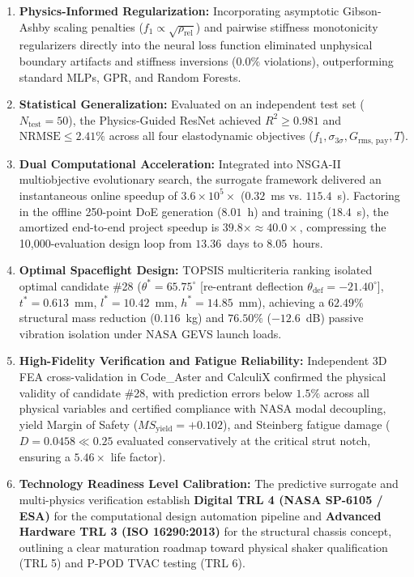 \documentclass[preprint,12pt,3p]{elsarticle}
\newcommand{\Grmspay}{G_{\text{rms, pay}}}
\begin{document}
\begin{enumerate}
  \item \textbf{Physics-Informed Regularization:} Incorporating asymptotic Gibson-Ashby scaling penalties ($f_1 \propto \sqrt{\rho_{\text{rel}}}$) and pairwise stiffness monotonicity regularizers directly into the neural loss function eliminated unphysical boundary artifacts and stiffness inversions ($0.0\%$ violations), outperforming standard MLPs, GPR, and Random Forests.
  \item \textbf{Statistical Generalization:} Evaluated on an independent test set ($N_{\text{test}} = 50$), the Physics-Guided ResNet achieved $R^2 \ge 0.981$ and $\text{NRMSE} \le 2.41\%$ across all four elastodynamic objectives ($f_1, \sigma_{3\sigma}, \Grmspay, T$).
  \item \textbf{Dual Computational Acceleration:} Integrated into NSGA-II multiobjective evolutionary search, the surrogate framework delivered an instantaneous online speedup of $3.6 \times 10^5\times$ ($0.32$~ms vs. $115.4$~s). Factoring in the offline 250-point DoE generation ($8.01$~h) and training ($18.4$~s), the amortized end-to-end project speedup is $39.8\times \approx 40.0\times$, compressing the 10,000-evaluation design loop from $13.36$~days to $8.05$~hours.
  \item \textbf{Optimal Spaceflight Design:} TOPSIS multicriteria ranking isolated optimal candidate \#28 ($\theta^* = 65.75^\circ$ [re-entrant deflection $\theta_{\text{def}} = -21.40^\circ$], $t^* = 0.613$~mm, $l^* = 10.42$~mm, $h^* = 14.85$~mm), achieving a $62.49\%$ structural mass reduction ($0.116$~kg) and $76.50\%$ ($-12.6$~dB) passive vibration isolation under NASA GEVS launch loads.
  \item \textbf{High-Fidelity Verification and Fatigue Reliability:} Independent 3D FEA cross-validation in Code\_Aster and CalculiX confirmed the physical validity of candidate \#28, with prediction errors below $1.5\%$ across all physical variables and certified compliance with NASA modal decoupling, yield Margin of Safety ($MS_{\text{yield}} = +0.102$), and Steinberg fatigue damage ($D = 0.0458 \ll 0.25$ evaluated conservatively at the critical strut notch, ensuring a $5.46\times$ life factor).
  \item \textbf{Technology Readiness Level Calibration:} The predictive surrogate and multi-physics verification establish \textbf{Digital TRL 4 (NASA SP-6105 / ESA)} for the computational design automation pipeline and \textbf{Advanced Hardware TRL 3 (ISO 16290:2013)} for the structural chassis concept, outlining a clear maturation roadmap toward physical shaker qualification (TRL 5) and P-POD TVAC testing (TRL 6).
\end{enumerate}
\end{document}
